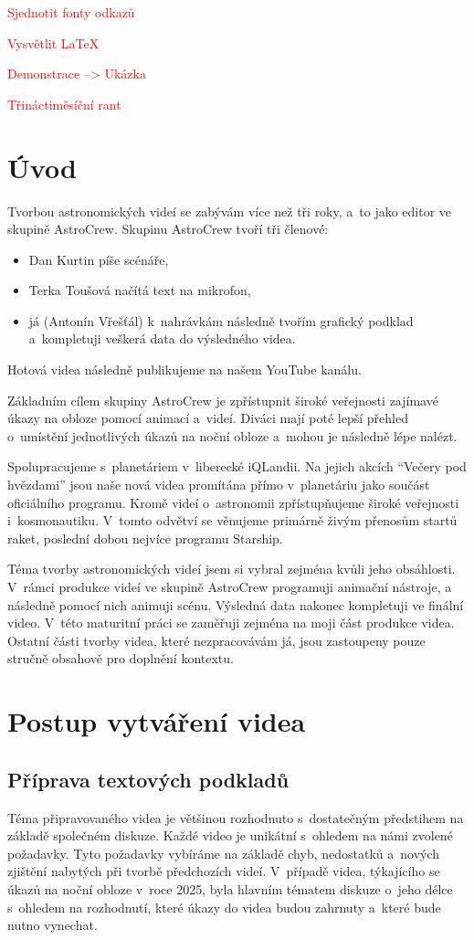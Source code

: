 \documentclass[12pt,a4paper,titlepage]{article}
\newcommand{\todo}[1]{\textcolor{red}{#1}}
\begin{document}
\todo{Sjednotit fonty odkazů}

\todo{Vysvětlit \LaTeX}

\todo{Demonstrace --> Ukázka}

\todo{Třináctiměsíční rant}

\section{Úvod}
Tvorbou astronomických videí se zabývám více než tři roky, a~to jako editor ve skupině AstroCrew. Skupinu AstroCrew tvoří tři členové:

\begin{itemize}
	\item Dan Kurtin píše scénáře,
	\item Terka Toušová načítá text na mikrofon,
	\item já (Antonín Vřešťál) k~nahrávkám následně tvořím grafický podklad a~kompletuji veškerá data do výsledného videa.
\end{itemize}
Hotová videa následně publikujeme na našem YouTube kanálu. 

Základním cílem skupiny AstroCrew je zpřístupnit široké veřejnosti zajímavé úkazy na obloze pomocí animací a~videí. Diváci mají poté lepší přehled o~umístění jednotlivých úkazů na noční obloze a~mohou je následně lépe nalézt.

Spolupracujeme s~planetáriem v~liberecké iQLandii. Na jejich akcích \enquote{Večery pod hvězdami} jsou naše nová videa promítána přímo v~planetáriu jako součást oficiálního programu. Kromě videí o~astronomii zpřístupňujeme široké veřejnosti i~kosmonautiku. V~tomto odvětví se věnujeme primárně živým přenosům startů raket, poslední dobou nejvíce programu Starship.

Téma tvorby astronomických videí jsem si vybral zejména kvůli jeho obsáhlosti. V~rámci produkce videí ve skupině AstroCrew programuji animační nástroje, a následně pomocí nich animuji scénu. Výsledná data nakonec kompletuji ve finální video. V~této maturitní práci se zaměřuji zejména na moji část produkce videa. Ostatní části tvorby videa, které nezpracovávám já, jsou zastoupeny pouze stručně obsahově pro doplnění kontextu. 
\section{Postup vytváření videa}\label{makingof}
\subsection{Příprava textových podkladů}\label{makingof:text-prep}
Téma připravovaného videa je většinou rozhodnuto s~dostatečným předstihem na základě společném diskuze. Každé video je unikátní s~ohledem na námi zvolené požadavky. Tyto požadavky vybíráme na základě chyb, nedostatků a~nových zjištění nabytých při tvorbě předchozích videí. V~případě videa, týkajícího se úkazů na noční obloze v~roce 2025, byla hlavním tématem diskuze o~jeho délce s~ohledem na rozhodnutí, které úkazy do videa budou zahrnuty a~které bude nutno vynechat.
\end{document}
